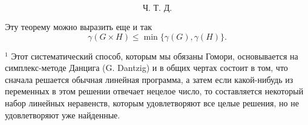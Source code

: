 \[
\text{Ч. Т. Д.}
\]

Эту теорему можно выразить еще и так
\[
\gamma(G \times H) \leq \min\{\gamma(G), \gamma(H)\}.
\]

\(^1\) Этот систематический способ, которым мы обязаны Гомори, основывается на симплекс-методе Данцига (G. Dantzig) и в общих чертах состоит в том, что сначала решается обычная линейная программа, а затем если какой-нибудь из переменных в этом решении отвечает нецелое число, то составляется некоторый набор линейных неравенств, которым удовлетворяют все целые решения, но не удовлетворяют уже найденные.

